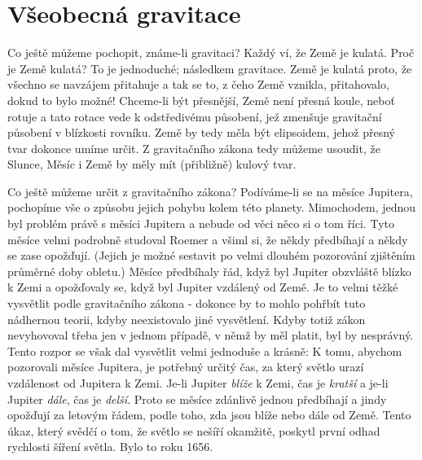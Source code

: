   \section{Všeobecná gravitace}
    Co ještě můžeme pochopit, známe-li gravitaci? Každý ví, že Země je kulatá. Proč je Země kulatá? 
    To je jednoduché; následkem gravitace. Země je kulatá proto, že všechno se navzájem přitahuje a 
    tak se to, z čeho Země vznikla, přitahovalo, dokud to bylo možné! Chceme-li být přesnější, Země 
    není přesná koule, neboť rotuje a tato rotace vede k odstředivému působení, jež zmenšuje 
    gravitační působení v blízkosti rovníku. Země by tedy měla být elipsoidem, jehož přesný tvar 
    dokonce umíme určit. Z gravitačního zákona tedy můžeme usoudit, že Slunce, Měsíc i Země by měly 
    mít (přibližně) kulový tvar.
    
    Co ještě můžeme určit z gravitačního zákona? Podíváme-li se na měsíce Jupitera, pochopíme vše o 
    způsobu jejich pohybu kolem této planety. Mimochodem, jednou byl problém právě s měsíci 
    Jupitera a nebude od věci něco si o tom říci. Tyto měsíce velmi podrobně studoval Roemer a 
    všiml si, že někdy předbíhají  a někdy se zase opožďují. (Jejich  
    je možné sestavit po velmi dlouhém pozorování zjištěním průměrné doby obletu.) Měsíce 
    předbíhaly řád, když byl Jupiter obzvláště blízko k Zemi a opožďovaly se, když byl Jupiter 
    vzdálený od Země. Je to velmi těžké vysvětlit podle gravitačního zákona - dokonce by to mohlo 
    pohřbít tuto nádhernou teorii, kdyby neexistovalo jiné vysvětlení. Kdyby totiž zákon 
    nevyhovoval třeba jen v jednom případě, v němž by měl platit, byl by nesprávný. Tento rozpor se 
    však dal vysvětlit velmi jednoduše a krásně: K tomu, abychom pozorovali měsíce Jupitera, je 
    potřebný určitý čas, za který světlo urazí vzdálenost od Jupitera k Zemi. Je-li Jupiter 
    \emph{blíže} k Zemi, čas je \emph{kratší} a je-li Jupiter \emph{dále}, čas je \emph{delší}. 
    Proto se měsíce zdánlivě jednou předbíhají a jindy opožďují za letovým řádem, podle toho, zda 
    jsou blíže nebo dále od Země. Tento úkaz, který svědčí o tom, že světlo se nešíří okamžitě, 
    poskytl první odhad rychlosti šíření světla. Bylo to roku 1656.
    
